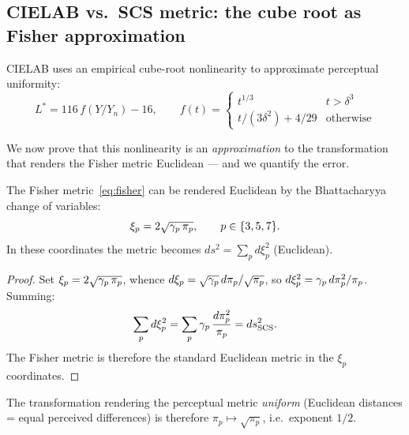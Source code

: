 \documentclass[12pt,a4paper]{article}
\begin{document}
\subsection{CIELAB vs.\ SCS metric: the cube root as Fisher approximation}

CIELAB uses an empirical cube-root nonlinearity to approximate
perceptual uniformity:
\begin{equation}
  L^* = 116\,f(Y/Y_n) - 16, \qquad
  f(t) = \begin{cases} t^{1/3} & t > \delta^3 \\
  t/(3\delta^2) + 4/29 & \text{otherwise} \end{cases}
  \label{eq:cielab}
\end{equation}

We now prove that this nonlinearity is an \emph{approximation} to the
transformation that renders the Fisher metric Euclidean --- and we
quantify the error.

\begin{derivedbox}
The Fisher metric~\eqref{eq:fisher} can be rendered Euclidean by the
Bhattacharyya change of variables:
\begin{equation}
  \xi_p = 2\sqrt{\gamma_{p}\,\pi_p}, \qquad p \in \{3, 5, 7\}.
  \label{eq:bhattacharyya}
\end{equation}
In these coordinates the metric becomes
$ds^2 = \sum_p d\xi_p^2$ (Euclidean).

\begin{proof}
Set $\xi_p = 2\sqrt{\gamma_{p}\,\pi_p}$, whence
$d\xi_p = \sqrt{\gamma_{p}}\,d\pi_p / \sqrt{\pi_p}$, so
$d\xi_p^2 = \gamma_{p}\,d\pi_p^2 / \pi_p$. Summing:
\[
  \sum_p d\xi_p^2
  = \sum_p \gamma_{p}\,\frac{d\pi_p^2}{\pi_p}
  = ds^2_{\mathrm{SCS}}.
\]
The Fisher metric is therefore the standard Euclidean metric in the
$\xi_p$ coordinates.
\end{proof}
\end{derivedbox}

The transformation rendering the perceptual metric \emph{uniform}
(Euclidean distances = equal perceived differences) is therefore
$\pi_p \mapsto \sqrt{\pi_p}$, i.e.\ exponent $1/2$.
\end{document}
